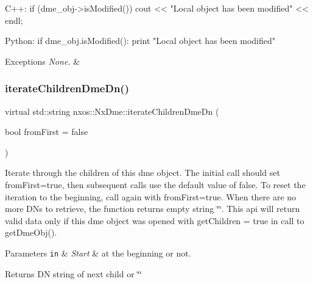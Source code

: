 \begin{DoxyCode}
C++:
   \textcolor{keywordflow}{if} (dme\_obj->isModified()) 
      cout << \textcolor{stringliteral}{"Local object has been modified"} << endl;

Python:
      \textcolor{keywordflow}{if} dme\_obj.isModified():
         print \textcolor{stringliteral}{"Local object has been modified"}
\end{DoxyCode}



\begin{DoxyExceptions}{Exceptions}
{\em None.} & \\
\hline
\end{DoxyExceptions}
\mbox{\label{classnxos_1_1_nx_dme_a61c6e95b39263694058082abeb377ac2}} 
\subsubsection{\texorpdfstring{iterate\+Children\+Dme\+Dn()}{iterateChildrenDmeDn()}}
{\footnotesize\ttfamily virtual std\+::string nxos\+::\+Nx\+Dme\+::iterate\+Children\+Dme\+Dn (\begin{DoxyParamCaption}\item[{bool}]{from\+First = {\ttfamily false} }\end{DoxyParamCaption})\hspace{0.3cm}{\ttfamily [pure virtual]}}

Iterate through the children of this dme object. The initial call should set from\+First=true, then subsequent calls use the default value of false. To reset the iteration to the beginning, call again with from\+First=true. When there are no more D\+Ns to retrieve, the function returns empty string \char`\"{}\char`\"{}. This api will return valid data only if this dme object was opened with \textquotesingle{}get\+Children = true\textquotesingle{} in call to get\+Dme\+Obj().


\begin{DoxyParams}[1]{Parameters}
\mbox{\tt in}  & {\em Start} & at the beginning or not. \\
\hline
\end{DoxyParams}
\begin{DoxyReturn}{Returns}
DN string of next child or \char`\"{}\char`\"{}
\end{DoxyReturn}

